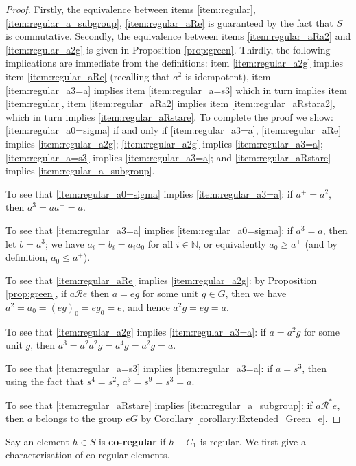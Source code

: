 \documentclass[a4paper, 11pt]{article}
\theoremstyle{plain}
\theoremstyle{definition}
\newcommand{\N} {\mathbb{N}}
\newcommand{\Define}    [1] {\textbf{#1}}
\begin{document}
\begin{proof}
Firstly, the equivalence between items \ref{item:regular}, \ref{item:regular_a_subgroup}, \ref{item:regular_aRe} is guaranteed by the fact that $S$ is commutative. Secondly, the equivalence between items \ref{item:regular_aRa2} and \ref{item:regular_a2g} is given in Proposition \ref{prop:green}. Thirdly, the following implications are immediate from the definitions: item \ref{item:regular_a2g} implies item \ref{item:regular_aRe} (recalling that $a^2$ is idempotent), item \ref{item:regular_a3=a}  implies item \ref{item:regular_a=s3} which in turn implies item \ref{item:regular},  item \ref{item:regular_aRa2} implies item \ref{item:regular_aRstara2}, which in turn implies \ref{item:regular_aRstare}. To complete the proof we show: \ref{item:regular_a0=sigma} if and only if \ref{item:regular_a3=a}, \ref{item:regular_aRe} implies  \ref{item:regular_a2g};  \ref{item:regular_a2g} implies \ref{item:regular_a3=a}; \ref{item:regular_a=s3} implies \ref{item:regular_a3=a}; and  \ref{item:regular_aRstare} implies \ref{item:regular_a_subgroup}.

To see that \ref{item:regular_a0=sigma} implies \ref{item:regular_a3=a}: if $a^+ = a^2$, then $a^3 = a a^+ = a$.

To see that \ref{item:regular_a3=a} implies \ref{item:regular_a0=sigma}: if $a^3 = a$, then let $b = a^3$; we have $a_i = b_i = a_ia_0$ for all $i \in \N$, or equivalently $a_0 \ge a^+$ (and by definition, $a_0 \le a^+$).

To see that \ref{item:regular_aRe} implies  \ref{item:regular_a2g}: by Proposition \ref{prop:green}, if $a \mathcal{R} e$ then   $a = eg$ for some unit $g \in G$, then we have $a^2 = a_0 = (eg)_0 = e g_0 = e$, and hence $a^2g = eg = a$.

To see that \ref{item:regular_a2g} implies \ref{item:regular_a3=a}: if $a = a^2g$ for some unit $g$, then $a^3 = a^2a^2g = a^4 g = a^2g=a$.

To see that \ref{item:regular_a=s3} implies \ref{item:regular_a3=a}:  if $a = s^3$, then using the fact that $s^4 = s^2$, $a^3 = s^9 = s^3 = a$.

To see that  \ref{item:regular_aRstare} implies \ref{item:regular_a_subgroup}: if $a \mathcal{R}^* e$, then $a$ belongs to the group $eG$ by Corollary \ref{corollary:Extended_Green_e}.
\end{proof}


Say an element $h \in S$ is \Define{co-regular} if $h + C_1$ is regular. We first give a characterisation of co-regular elements.
\end{document}
